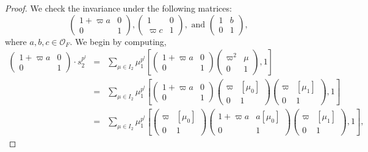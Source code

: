 \documentclass[10pt,a4paper]{amsart}
\begin{document}
\begin{proof}
  We check the invariance under the following matrices:
$$\begin{pmatrix}
      1+\varpi a  & 0 \\
      0 & 1 
  \end{pmatrix}, \begin{pmatrix}
      1  & 0 \\
      \varpi c & 1
  \end{pmatrix}, \text{ and } \begin{pmatrix}
      1  & b \\
      0 & 1 
  \end{pmatrix},$$
  where $a,b,c \in  \mathcal{O}_F$.
 We begin by computing,
  \begin{eqnarray*}
 \begin{pmatrix}
      1+\varpi a  & 0 \\
      0 & 1 
  \end{pmatrix} \cdot s_{2}^{p^l}  & = & \sum_{\mu \in I_2}\mu_{1}^{p^l}\left[\begin{pmatrix}
      1+\varpi a  & 0 \\
      0 & 1 
  \end{pmatrix} \begin{pmatrix} \varpi^{2} & \mu  \\ 0 & 1\end{pmatrix}, 1\right] \\
  & = &  \sum_{\mu \in I_2}\mu_{1}^{p^l}\left[\begin{pmatrix}
      1+\varpi a  & 0 \\
      0 & 1 
  \end{pmatrix} \begin{pmatrix} \varpi & [\mu_{0}]  \\ 0 & 1\end{pmatrix}\begin{pmatrix} \varpi & [\mu_{1}]  \\ 0 & 1\end{pmatrix}, 1\right]\\
  & = & \sum_{\mu \in I_2}\mu_{1}^{p^l}\left[ \begin{pmatrix} \varpi & [\mu_{0}]  \\ 0 & 1\end{pmatrix}\begin{pmatrix}
      1+\varpi a  & a[\mu_{0}] \\
      0 & 1 
  \end{pmatrix}\begin{pmatrix} \varpi & [\mu_{1}]  \\ 0 & 1\end{pmatrix}, 1\right],

\end{eqnarray*}
\end{proof}
\end{document}
